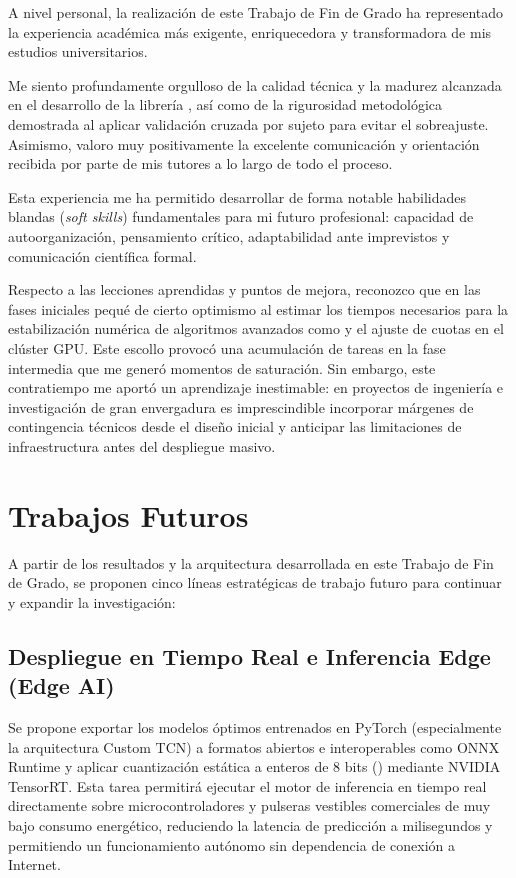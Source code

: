 A nivel personal, la realización de este Trabajo de Fin de Grado ha representado la experiencia académica más exigente, enriquecedora y transformadora de mis estudios universitarios. 

Me siento profundamente orgulloso de la calidad técnica y la madurez alcanzada en el desarrollo de la librería , así como de la rigurosidad metodológica demostrada al aplicar validación cruzada por sujeto para evitar el sobreajuste. Asimismo, valoro muy positivamente la excelente comunicación y orientación recibida por parte de mis tutores a lo largo de todo el proceso.

Esta experiencia me ha permitido desarrollar de forma notable habilidades blandas (\textit{soft skills}) fundamentales para mi futuro profesional: capacidad de autoorganización, pensamiento crítico, adaptabilidad ante imprevistos y comunicación científica formal. 

Respecto a las lecciones aprendidas y puntos de mejora, reconozco que en las fases iniciales pequé de cierto optimismo al estimar los tiempos necesarios para la estabilización numérica de algoritmos avanzados como \slstm{} y el ajuste de cuotas en el clúster GPU. Este escollo provocó una acumulación de tareas en la fase intermedia que me generó momentos de saturación. Sin embargo, este contratiempo me aportó un aprendizaje inestimable: en proyectos de ingeniería e investigación de gran envergadura es imprescindible incorporar márgenes de contingencia técnicos desde el diseño inicial y anticipar las limitaciones de infraestructura antes del despliegue masivo.


\section{Trabajos Futuros}
\label{sec:concl_futuro}

A partir de los resultados y la arquitectura desarrollada en este Trabajo de Fin de Grado, se proponen cinco líneas estratégicas de trabajo futuro para continuar y expandir la investigación:

\subsection{Despliegue en Tiempo Real e Inferencia Edge (Edge AI)}
Se propone exportar los modelos óptimos entrenados en PyTorch (especialmente la arquitectura Custom TCN) a formatos abiertos e interoperables como ONNX Runtime y aplicar cuantización estática a enteros de 8 bits () mediante NVIDIA TensorRT. Esta tarea permitirá ejecutar el motor de inferencia en tiempo real directamente sobre microcontroladores y pulseras vestibles comerciales de muy bajo consumo energético, reduciendo la latencia de predicción a milisegundos y permitiendo un funcionamiento autónomo sin dependencia de conexión a Internet.

